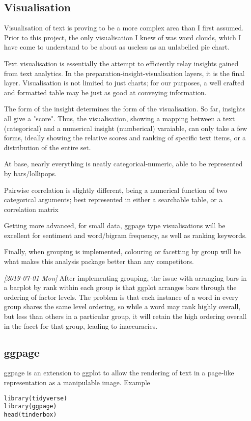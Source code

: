 \documentclass[a4paper, 11pt]{article}
\begin{document}
\subsection{Visualisation}
\label{sec:orgff56ea9}
Visualisation of text is proving to be a more complex area than I
first assumed. Prior to this project, the only visualisation I knew of
was word clouds, which I have come to understand to be about as
useless as an unlabelled pie chart.

Text visualisation is essentially the attempt to efficiently relay
insights gained from text analytics. In the
preparation-insight-visualisation layers, it is the final layer.
Visualisation is not limited to just charts; for our purposes, a well
crafted and formatted table may be just as good at conveying
information.

The form of the insight determines the form of the visualisation. So
far, insights all give a "score". Thus, the visualisation, showing a
mapping between a text (categorical) and a numerical insight
(numberical) varaiable, can only take a few forms, ideally showing the
relative scores and ranking of specific text items, or a distribution
of the entire set.

At base, nearly everything is neatly categorical-numeric, able to be
represented by bars/lollipops.

Pairwise correlation is slightly different, being a numerical function
of two categorical arguments; best represented in either a searchable
table, or a correlation matrix

Getting more advanced, for small data, ggpage type visualisations will
be excellent for sentiment and word/bigram frequency, as well as
ranking keywords.

Finally, when grouping is implemented, colouring or facetting by group
will be what makes this analysis package better than any competitors.

\textit{[2019-07-01 Mon] } After implementing grouping, the issue with arranging
bars in a barplot by rank within each group is that ggplot arranges
bars through the ordering of factor levels. The problem is that each
instance of a word in every group shares the same level ordering, so
while a word may rank highly overall, but less than others in a
particular group, it will retain the high ordering overall in the
facet for that group, leading to inaccuracies.

\subsection{ggpage}
\label{sec:org8a37f61}
ggpage is an extension to ggplot to allow the rendering of text in a
page-like representation as a manipulable image. 
Example
\begin{verbatim}
library(tidyverse)
library(ggpage)
head(tinderbox)
\end{verbatim}
\end{document}
